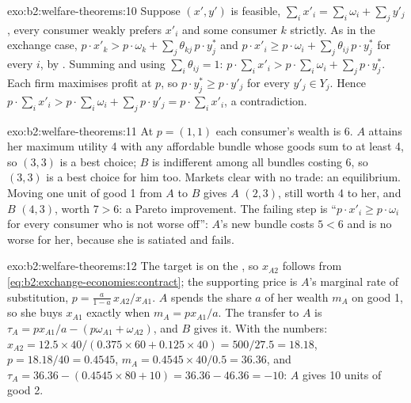 \begin{solution}{exo:b2:welfare-theorems:10}
Suppose $(x', y')$ is feasible, $\sum_i x'_i = \sum_i \omega_i + \sum_j y'_j$, every consumer weakly
prefers $x'_i$ and some consumer $k$ strictly. As in the exchange case, $p \cdot x'_k > p \cdot \omega_k +
\sum_j \theta_{kj}\,p \cdot y^*_j$ and $p \cdot x'_i \ge p \cdot \omega_i + \sum_j \theta_{ij}\,p \cdot
y^*_j$ for every $i$, by . Summing and using $\sum_i \theta_{ij} = 1$: $p \cdot \sum_i
x'_i > p \cdot \sum_i \omega_i + \sum_j p \cdot y^*_j$. Each firm maximises profit at $p$, so $p \cdot y^*_j
\ge p \cdot y'_j$ for every $y'_j \in Y_j$. Hence $p \cdot \sum_i x'_i > p \cdot \sum_i \omega_i + \sum_j
p \cdot y'_j = p \cdot \sum_i x'_i$, a contradiction.
\end{solution}

\begin{solution}{exo:b2:welfare-theorems:11}
At $p = (1, 1)$ each consumer's wealth is 6. $A$ attains her maximum utility 4 with any affordable bundle
whose goods sum to at least 4, so $(3, 3)$ is a best choice; $B$ is indifferent among all bundles costing
6, so $(3, 3)$ is a best choice for him too. Markets clear with no trade: an equilibrium. Moving one unit of
good 1 from $A$ to $B$ gives $A$ $(2, 3)$, still worth 4 to her, and $B$ $(4, 3)$, worth $7 > 6$: a Pareto
improvement. The failing step is ``$p \cdot x'_i \ge p \cdot \omega_i$ for every consumer who is not
worse off'': $A$'s new bundle costs $5 < 6$ and is no worse for her, because she is satiated and  fails.
\end{solution}

\begin{solution}{exo:b2:welfare-theorems:12}
The target is on the , so $x_{A2}$ follows from \eqref{eq:b2:exchange-economies:contract};
the supporting price is $A$'s marginal rate of substitution, $p = \frac{a}{1 - a}\,x_{A2}/x_{A1}$. $A$ spends
the share $a$ of her wealth $m_A$ on good 1, so she buys $x_{A1}$ exactly when $m_A = px_{A1}/a$. The
transfer to $A$ is $\tau_A = px_{A1}/a - (p\omega_{A1} + \omega_{A2})$, and $B$ gives it. With the numbers:
$x_{A2} = 12.5 \times 40/(0.375 \times 60 + 0.125 \times 40) = 500/27.5 = 18.18$, $p = 18.18/40 = 0.4545$,
$m_A = 0.4545 \times 40/0.5 = 36.36$, and $\tau_A = 36.36 - (0.4545 \times 80 + 10) = 36.36 - 46.36 = -10$:
$A$ gives 10 units of good 2.
\end{solution}

